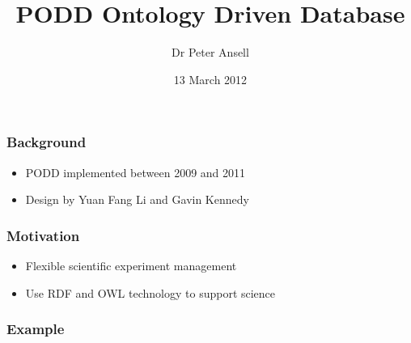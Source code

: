 \documentclass[12pt]{beamer}
\title{PODD Ontology Driven Database}
\author{Dr Peter Ansell}
\institute{University of Queensland}
\date{13 March 2012}
\begin{document}
\begin{frame}
\titlepage
\end{frame}


\begin{frame}
\frametitle{Background} 

\begin{itemize}
 \item PODD implemented between 2009 and 2011
 \item Design by Yuan Fang Li and Gavin Kennedy
\end{itemize}

\end{frame}

\begin{frame}
\frametitle{Motivation} 

\begin{itemize}
 \item Flexible scientific experiment management
 \item Use RDF and OWL technology to support science
\end{itemize}


\end{frame}

\begin{frame}
\frametitle{Example} 

\end{frame}

\bgroup
{}
\begin{frame}[plain]{}
\end{frame}
\egroup
\end{document}
